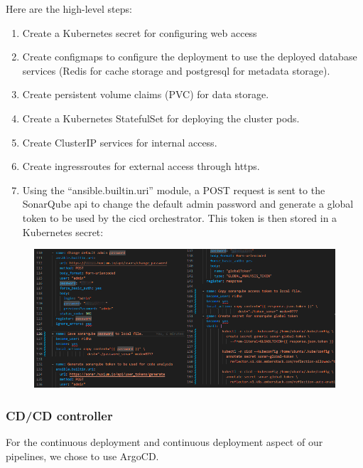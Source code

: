 Here are the high-level steps: 
\begin{enumerate}
\item Create a Kubernetes secret for configuring web access 
\item Create configmaps to configure the deployment to use the deployed database services (Redis for cache storage and postgresql for metadata storage). 
\item Create persistent volume claims (PVC) for data storage. 
\item Create a Kubernetes StatefulSet for deploying the cluster pods. 
\item Create ClusterIP services for internal access. 
\item Create ingressroutes for external access through https. 
\item Using the “ansible.builtin.uri” module, a POST request is sent to the SonarQube api to change the default admin password and generate a global token to be used by the cicd orchestrator. This token is then stored in a Kubernetes secret: 
\end{enumerate}

\begin{figure}[H]\centering
\includegraphics[width=1.0\textwidth,angle=00]{assets/f42.png}
\end{figure}

\subsubsection{CD/CD controller }

For the continuous deployment and continuous deployment aspect of our pipelines, we chose to use ArgoCD. 

